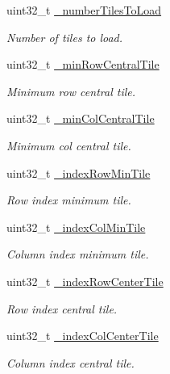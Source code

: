 \begin{DoxyCompactItemize}
uint32\+\_\+t \hyperlink{classfi_1_1HTGSViewRequestData_aaefe54e23f62e0a3f0d3ac850d61bed7}{\+\_\+number\+Tiles\+To\+Load}
\begin{DoxyCompactList}\small\item\em Number of tiles to load. \end{DoxyCompactList}\item 
uint32\+\_\+t \hyperlink{classfi_1_1HTGSViewRequestData_ac7195ca863729dad992cecc8cee33543}{\+\_\+min\+Row\+Central\+Tile}
\begin{DoxyCompactList}\small\item\em Minimum row central tile. \end{DoxyCompactList}\item 
uint32\+\_\+t \hyperlink{classfi_1_1HTGSViewRequestData_ac8d1518676852d4f0b9ffee49711e285}{\+\_\+min\+Col\+Central\+Tile}
\begin{DoxyCompactList}\small\item\em Minimum col central tile. \end{DoxyCompactList}\item 
uint32\+\_\+t \hyperlink{classfi_1_1HTGSViewRequestData_a2db3bda31418dc59cdf81a23f4cba188}{\+\_\+index\+Row\+Min\+Tile}
\begin{DoxyCompactList}\small\item\em Row index minimum tile. \end{DoxyCompactList}\item 
uint32\+\_\+t \hyperlink{classfi_1_1HTGSViewRequestData_a4aede083c3d213cd6bbe433caa2ef552}{\+\_\+index\+Col\+Min\+Tile}
\begin{DoxyCompactList}\small\item\em Column index minimum tile. \end{DoxyCompactList}\item 
uint32\+\_\+t \hyperlink{classfi_1_1HTGSViewRequestData_afce94101853288076d5a513f5d5599c6}{\+\_\+index\+Row\+Center\+Tile}
\begin{DoxyCompactList}\small\item\em Row index central tile. \end{DoxyCompactList}\item 
uint32\+\_\+t \hyperlink{classfi_1_1HTGSViewRequestData_ada3a9600b2e93609a3bf97916106db82}{\+\_\+index\+Col\+Center\+Tile}
\begin{DoxyCompactList}\small\item\em Column index central tile. \end{DoxyCompactList}\item 

\end{DoxyCompactItemize}
